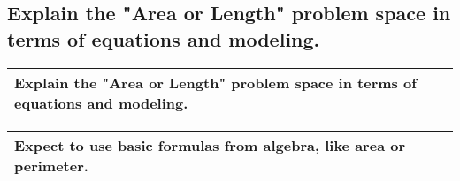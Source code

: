 \subsection{
        Explain the "Area or Length" problem space in terms of equations and
    modeling.}
\begin{small}
    \begin{tabularx}{1\textwidth}{
            p{}
        }
        \toprule
        Explain the "Area or Length" problem space in terms of equations and
        modeling.
        \\
        \bottomrule
    \end{tabularx}
\end{small}
\begin{small}
    \begin{tabularx}{1\textwidth}{
            p{}
        }
        \toprule
        Expect to use basic formulas from algebra, like area or perimeter.
        \\
        \bottomrule
    \end{tabularx}
\end{small}
